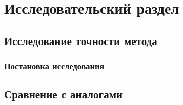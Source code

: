 \chapter{Исследовательский раздел}

\section{Исследование точности метода}

\subsection{Постановка исследования}

\section{Сравнение с аналогами}
